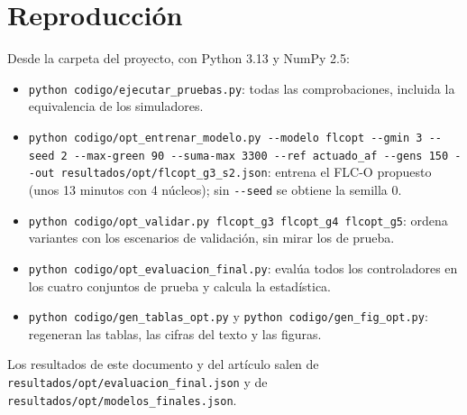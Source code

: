 \documentclass[journal]{IEEEtran}
\newcommand{\FLC}{FLC-O}
\begin{document}
\section{Reproducción}
\label{sec:s-repro}
Desde la carpeta del proyecto, con Python 3.13 y NumPy 2.5:
\begin{itemize}
\item \texttt{python codigo/ejecutar\_pruebas.py}: todas las comprobaciones, incluida la equivalencia de los simuladores.
\item \texttt{python codigo/opt\_entrenar\_modelo.py -{}-modelo flcopt -{}-gmin 3 -{}-seed 2 -{}-max-green 90 -{}-suma-max 3300 -{}-ref actuado\_af -{}-gens 150 -{}-out resultados/opt/flcopt\_g3\_s2.json}: entrena el \FLC{} propuesto (unos 13 minutos con 4 núcleos); sin \texttt{-{}-seed} se obtiene la semilla 0.
\item \texttt{python codigo/opt\_validar.py flcopt\_g3 flcopt\_g4 flcopt\_g5}: ordena variantes con los escenarios de validación, sin mirar los de prueba.
\item \texttt{python codigo/opt\_evaluacion\_final.py}: evalúa todos los controladores en los cuatro conjuntos de prueba y calcula la estadística.
\item \texttt{python codigo/gen\_tablas\_opt.py} y \texttt{python codigo/gen\_fig\_opt.py}: regeneran las tablas, las cifras del texto y las figuras.
\end{itemize}
Los resultados de este documento y del artículo salen de \texttt{resultados/opt/evaluacion\_final.json} y de \texttt{resultados/opt/modelos\_finales.json}.



\end{document}

